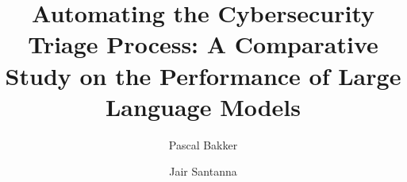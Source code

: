 \documentclass[balance=false,nonacm,sigconf]{acmart}
\begin{document}
    \title[Automating the Cybersecurity Triage Process]{Automating the Cybersecurity Triage Process: A Comparative Study on the Performance of Large Language Models}

    \author{Pascal Bakker}
    \author{Jair Santanna}

    

    \maketitle

    
    
    
    

    
    

\end{document}
